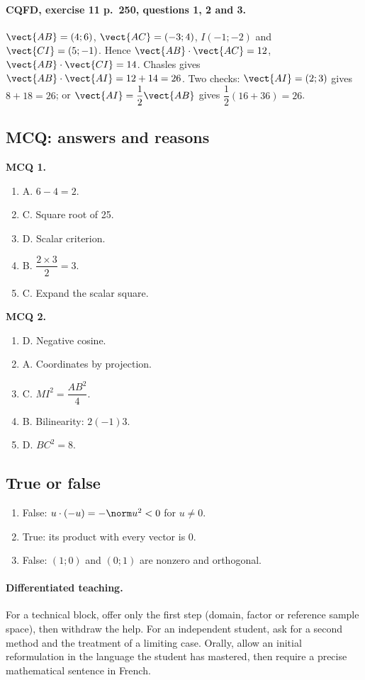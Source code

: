 \paragraph{CQFD, exercise 11 p.~250, questions 1, 2 and 3.} $\vect{AB}=(4;6)$, $\vect{AC}=(-3;4)$, $I(-1;-2)$ and $\vect{CI}=(5;-1)$. Hence $\vect{AB}\cdot\vect{AC}=12$, $\vect{AB}\cdot\vect{CI}=14$. Chasles gives $\vect{AB}\cdot\vect{AI}=12+14=26$. Two checks: $\vect{AI}=(2;3)$ gives $8+18=26$; or $\vect{AI}=\dfrac12\vect{AB}$ gives $\dfrac12(16+36)=26$.
\subsection*{MCQ: answers and reasons}
\textbf{MCQ 1.}
\begin{enumerate}
\item A. $6-4=2$.
\item C. Square root of 25.
\item D. Scalar criterion.
\item B. $\dfrac{2\times 3}{2}=3$.
\item C. Expand the scalar square.
\end{enumerate}
\textbf{MCQ 2.}
\begin{enumerate}
\item D. Negative cosine.
\item A. Coordinates by projection.
\item C. $MI^2=\dfrac{AB^2}{4}$.
\item B. Bilinearity: $2(-1)3$.
\item D. $BC^2=8$.
\end{enumerate}
\subsection*{True or false}
\begin{enumerate}
\item False: $u\cdot(-u)=-\norm u^2<0$ for $u\ne0$.
\item True: its product with every vector is 0.
\item False: $(1;0)$ and $(0;1)$ are nonzero and orthogonal.
\end{enumerate}
\paragraph{Differentiated teaching.} For a technical block, offer only the first step (domain, factor or reference sample space), then withdraw the help. For an independent student, ask for a second method and the treatment of a limiting case. Orally, allow an initial reformulation in the language the student has mastered, then require a precise mathematical sentence in French.

